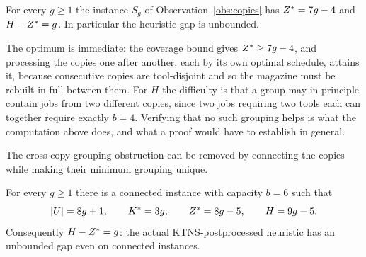 \begin{conjecture}\label{conj:disconnected}
For every $g\ge1$ the instance $S_g$ of Observation~\ref{obs:copies} has
$Z^{\ast}=7g-4$ and $H-Z^{\ast}=g$. In particular the heuristic gap is unbounded.
\end{conjecture}

\begin{support}
The optimum is immediate: the coverage bound gives $Z^{\ast}\ge7g-4$, and processing the
copies one after another, each by its own optimal schedule, attains it, because
consecutive copies are tool-disjoint and so the magazine must be rebuilt in full
between them. For $H$ the difficulty is that a group may in principle contain jobs
from two different copies, since two jobs requiring two tools each can together
require exactly $b=4$. Verifying that no such grouping helps is what the computation
above does, and what a proof would have to establish in general.
\end{support}

The cross-copy grouping obstruction can be removed by connecting the copies while
making their minimum grouping unique.

\begin{theorem}\label{thm:connected-gap}
For every $g\ge1$ there is a connected instance with capacity $b=6$ such that
\[
  \lvert U\rvert=8g+1,\qquad K^{\ast}=3g,\qquad
  Z^{\ast}=8g-5,\qquad H=9g-5.
\]
Consequently $H-Z^{\ast}=g$: the actual KTNS-postprocessed heuristic has an unbounded
gap even on connected instances.
\end{theorem}

